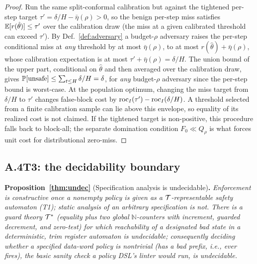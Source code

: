 \begin{proof}
Run the same split-conformal calibration but against the tightened per-step target
$\tau'=\delta/H-\bar\eta(\rho)>0$, so the benign per-step miss satisfies
$\mathbb{E}[r(\hat\theta)]\le\tau'$ over the calibration draw (the miss at a given calibrated
threshold can exceed $\tau'$). By
Def.~\ref{def:adversary} a budget-$\rho$ adversary raises the per-step conditional miss at
\emph{any} threshold by at most $\bar\eta(\rho)$, to at most $r(\hat\theta)+\bar\eta(\rho)$,
whose calibration expectation is at most $\tau'+\bar\eta(\rho)=\delta/H$. The
union bound of the upper part, conditional on $\hat\theta$ and then averaged over the
calibration draw, gives $\mathbb{P}[\text{unsafe}]\le\sum_{t\le H}\delta/H=\delta$,
for \emph{any} budget-$\rho$ adversary since the per-step bound is worst-case.
At the population optimum, changing the miss target from $\delta/H$ to $\tau'$
changes false-block cost by
$\mathrm{roc}_I(\tau')-\mathrm{roc}_I(\delta/H)$. A threshold selected from a finite calibration
sample can lie above this envelope, so equality of its realized cost is not
claimed. If the tightened target is non-positive, this procedure falls back to
block-all; the separate domination condition $F_0\ll Q_\rho$ is what forces unit
cost for distributional zero-miss.
\end{proof}

\subsection*{A.4\quad T3: the decidability boundary}
\noindent\textbf{Proposition~\ref{thm:undec}} (Specification analysis is undecidable)\textbf{.}
\emph{Enforcement is constructive once a nonempty policy is given as a $\mathcal{T}$-representable
safety automaton (T1); static analysis of an arbitrary specification is not. There is a guard
theory $\mathcal{T}^{\ast}$ (equality plus two global $\mathbb N$-counters with
increment, guarded decrement, and zero-test)
for which reachability of a designated bad state in a deterministic, trim register automaton is
undecidable; consequently deciding whether a specified data-word policy is nontrivial (has a
bad prefix, i.e., ever fires), the basic sanity check a policy DSL's linter would run, is
undecidable.}

